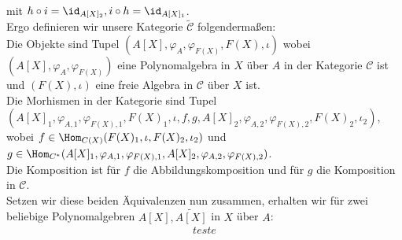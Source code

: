 \begin{solution}
\begin{align*}
\end{align*}
mit $h \circ i = \id_{A[X]_2}, i \circ h = \id_{A[X]_1}$. \\
Ergo definieren wir unsere Kategorie $\widetilde{\mathcal{C}}$ folgendermaßen:\\
Die Objekte sind Tupel $(A[X],\varphi_A,\varphi_{F(X)},F(X),\iota)$ wobei $(A[X],\varphi_A,\varphi_{F(X)})$
eine Polynomalgebra in $X$ über $A$ in der Kategorie $\mathcal{C}$ ist und
$(F(X),\iota)$ eine freie Algebra in $\mathcal{C}$ über $X$ ist. \\
Die Morhismen in der Kategorie sind Tupel
$(A[X]_1,\varphi_{A,1},\varphi_{F(X),1},F(X)_1,\iota,f,g,A[X]_2,\varphi_{A,2},\varphi_{F(X),2},F(X)_2,\iota_2)$,
wobei $f \in \Hom_{C(X)}(F(X)_1,\iota,F(X)_2,\iota_2)$
und $g \in \Hom_{C^*}(A[X]_1,\varphi_{A,1},\varphi_{F(X),1},A[X]_2,\varphi_{A,2},\varphi_{F(X),2})$. \\
Die Komposition ist für $f$ die Abbildungskomposition und für $g$ die Komposition in $\mathcal{C}$. \\
Setzen wir diese beiden Äquivalenzen nun zusammen, erhalten wir für zwei
beliebige Polynomalgebren $A[X], \widetilde{A[X]}$ in $X$ über $A$:
\begin{align*}
  teste
\end{align*}
\end{solution}
